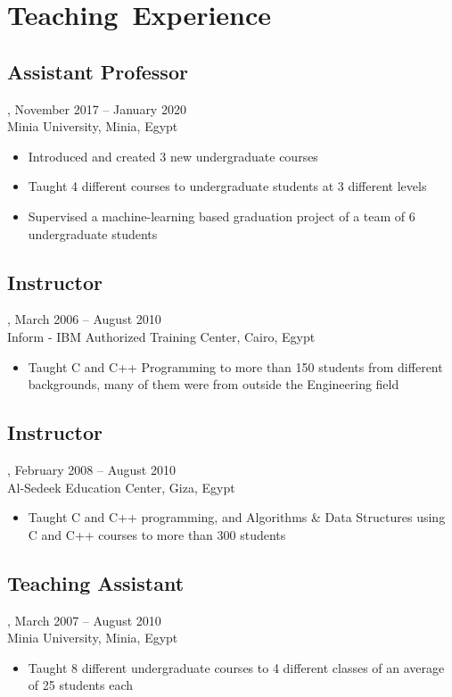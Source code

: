 \section{Teaching~Experience}
\subsection{Assistant Professor}, November 2017 -- January 2020\\
Minia University, Minia, Egypt
\begin{itemize}
\item Introduced and created 3 new undergraduate courses
\item Taught 4 different courses to undergraduate students at 3 different levels
\item Supervised a machine-learning based graduation project of a team of 6 undergraduate students
\end{itemize}
\subsection{Instructor}, March 2006 -- August 2010\\
Inform - IBM Authorized Training Center, Cairo, Egypt
\begin{itemize}
\item Taught C and C++ Programming to more than 150 students from different backgrounds, many of them were from outside the Engineering field
\end{itemize}

\subsection{Instructor}, February 2008 -- August 2010\\
Al-Sedeek Education Center, Giza, Egypt
\begin{itemize}
\item Taught C and C++ programming, and Algorithms \& Data Structures using C and C++ courses to more than 300 students
\end{itemize}

\subsection{Teaching Assistant}, March 2007 -- August 2010\\
Minia University, Minia, Egypt
\begin{itemize}
\item Taught 8 different undergraduate courses to 4 different classes of an average of 25 students each
\end{itemize}

